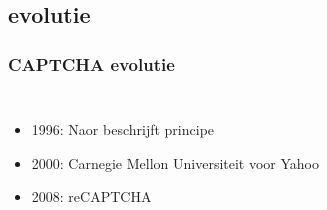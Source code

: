 \documentclass{beamer}
\begin{document}
\subsection{evolutie}
\begin{frame}
  \frametitle{CAPTCHA evolutie}
  \transfade
  \begin{columns}[c]
       \begin{itemize}
         \item<+-> 1996: Naor beschrijft principe
  	     \item<+-> 2000: Carnegie Mellon Universiteit voor Yahoo
  	     \item<+-> 2008: reCAPTCHA
       \end{itemize}
      \begin{center}
      \end{center}
  \end{columns}
\end{frame}
\end{document}
